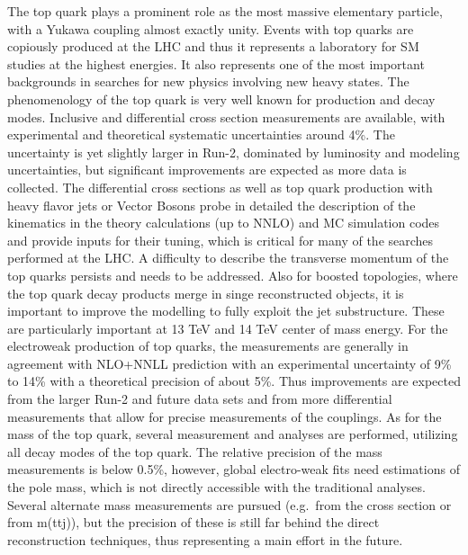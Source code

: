 \noindent The top quark plays a prominent
role as the most massive elementary particle, with a Yukawa coupling
almost exactly unity. Events with top quarks are copiously produced at
the LHC and thus it represents a laboratory for SM studies at the
highest energies. It also represents one of the most important
backgrounds in searches for new physics involving new heavy states. The
phenomenology of the top quark is very well known for production and
decay modes. Inclusive and differential cross section measurements are
available, with experimental and theoretical systematic uncertainties
around 4\%. The uncertainty is yet slightly larger in Run-2, dominated
by luminosity and modeling uncertainties, but significant improvements
are expected as more data is collected. The differential cross sections
as well as top quark production with heavy flavor jets or Vector Bosons
probe in detailed the description of the kinematics in the theory
calculations (up to NNLO) and MC simulation codes and provide inputs for
their tuning, which is critical for many of the searches performed at
the LHC. A difficulty to describe the transverse momentum of the top
quarks persists and needs to be addressed. Also for boosted topologies,
where the top quark decay products merge in singe reconstructed objects,
it is important to improve the modelling to fully exploit the jet
substructure. These are particularly important at 13 TeV and 14 TeV
center of mass energy. For the electroweak production of top quarks, the
measurements are generally in agreement with NLO+NNLL prediction with an
experimental uncertainty of 9\% to 14\% with a theoretical precision of
about 5\%. Thus improvements are expected from the larger Run-2 and
future data sets and from more differential measurements that allow for
precise measurements of the couplings. As for the mass of the top quark,
several measurement and analyses are performed, utilizing all decay
modes of the top quark. The relative precision of the mass measurements
is below 0.5\%, however, global electro-weak fits need estimations of
the pole mass, which is not directly accessible with the traditional
analyses. Several alternate mass measurements are pursued (e.g.~from the
cross section or from m(ttj)), but the precision of these is still far
behind the direct reconstruction techniques, thus representing a main
effort in the future.